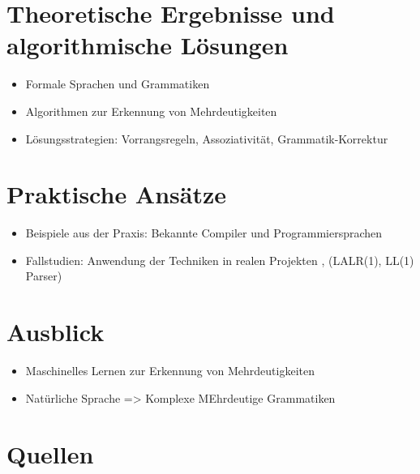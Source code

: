 \documentclass[t]{beamer}
\begin{document}
	\section{Theoretische Ergebnisse und algorithmische Lösungen}\label{sec:theoretische-ergebnisse-und-algorithmische-losungen}
	\begin{frame}
		\begin{itemize}
			\item Formale Sprachen und Grammatiken
			\item Algorithmen zur Erkennung von Mehrdeutigkeiten
			\item Lösungsstrategien: Vorrangsregeln, Assoziativität, Grammatik-Korrektur
		\end{itemize}
	\end{frame}


	\section{Praktische Ansätze}\label{sec:praktische-ansatze}
	\begin{frame}
		\begin{itemize}
			\item Beispiele aus der Praxis: Bekannte Compiler und Programmiersprachen
			\item Fallstudien: Anwendung der Techniken in realen Projekten , (LALR(1), LL(1) Parser)
		\end{itemize}
	\end{frame}


	\section{Ausblick}\label{sec:ausblick-und-zukunftige-projekte}
	\begin{frame}
		\begin{itemize}
			\item Maschinelles Lernen zur Erkennung von Mehrdeutigkeiten
			\item Natürliche Sprache => Komplexe MEhrdeutige Grammatiken
		\end{itemize}
	\end{frame}


	\section{Quellen}\label{sec:quellen}
	\begin{frame}[allowframebreaks]
		
		
	\end{frame}
\end{document}
